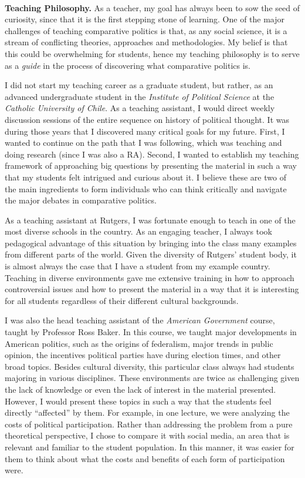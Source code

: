\vspace{-2cm}{\bf \huge Teaching Statement}\\

{\bf Teaching Philosophy.} As a teacher, my goal has always been to sow the seed of curiosity, since that it is the first stepping stone of learning. One of the major challenges of teaching comparative politics is that, as any social science, it is a stream of conflicting theories, approaches and methodologies. My belief is that this could be overwhelming for students, hence my teaching philosophy is to serve as a \emph{guide} in the process of discovering what comparative politics is.

I did not start my teaching career as a graduate student, but rather, as an advanced undergraduate student in the \emph{Institute of Political Science} at the \emph{Catholic University of Chile}. As a teaching assistant, I would direct weekly discussion sessions of the entire sequence on history of political thought. It was during those years that I discovered many critical goals for my future. First, I wanted to continue on the path that I was following, which was teaching and doing research (since I was also a RA). Second, I wanted to establish my teaching framework of approaching big questions by presenting the material in such a way that my students felt intrigued and curious about it. I believe these are two of the main ingredients to form individuals who can think critically and navigate the major debates in comparative politics. 

As a teaching assistant at Rutgers, I was fortunate enough to teach in one of the most diverse schools in the country. As an engaging teacher, I always took pedagogical advantage of this situation by bringing into the class many examples from different parts of the world. Given the diversity of Rutgers' student body, it is almost always the case that I have a student from my example country. Teaching in diverse environments gave me extensive training in how to approach controversial issues and how to present the material in a way that it is interesting for all students regardless of their different cultural backgrounds. 

I was also the head teaching assistant of the \emph{American Government} course, taught by Professor Ross Baker. In this course, we taught major developments in American politics, such as the origins of federalism, major trends in public opinion, the incentives political parties have during election times, and other broad topics. Besides cultural diversity, this particular class always had students majoring in various disciplines. These environments are twice as challenging given the lack of knowledge or even the lack of interest in the material presented. However, I would present these topics in such a way that the students feel directly ``affected'' by them. For example, in one lecture, we were analyzing the costs of political participation. Rather than addressing the problem from a pure theoretical perspective, I chose to compare it with social media, an area that is relevant and familiar to the student population. In this manner, it was easier for them to think about what the costs and benefits of each form of participation were. 

